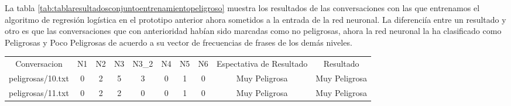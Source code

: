 La tabla \ref{tab:tablaresultadosconjuntoentrenamientopeligroso} muestra los resultados de las conversaciones con las que entrenamos el algoritmo de regresi\'on log\'istica en el prototipo anterior ahora sometidos a la entrada de la red neuronal. La diferenci\'ia entre un resultado y otro es que las conversaciones que con anterioridad hab\'ian sido marcadas como no peligrosas, ahora la red neuronal la ha clasificado como Peligrosas y Poco Peligrosas de acuerdo a su vector de frecuencias de frases de los dem\'as niveles. 
\begin{table}[h]
\small
\begin{tabular}{|c|c|c|c|c|c|c|c|c|c|}
\hline
Conversacion & N1 & N2 & N3 & N3\_2 & N4 & N5 & N6 & Espectativa de Resultado & Resultado \\

peligrosas/10.txt
& 0
& 2
& 5
& 3
& 0
& 1
& 0
& Muy Peligrosa
& Muy Peligrosa \\
peligrosas/11.txt
&  0
& 2
& 2
& 0
& 0
& 1
& 0
& Muy Peligrosa
& Muy Peligrosa \\


\end{tabular}
\end{table}
